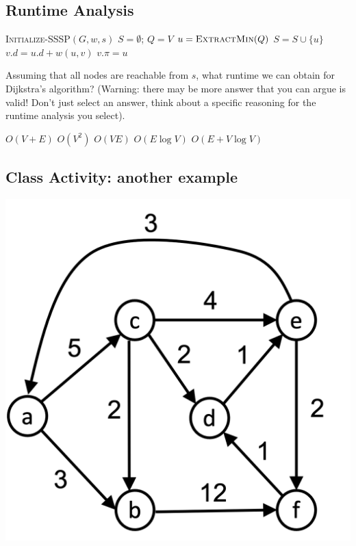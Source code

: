 \documentclass[11  pt]{exam}
\begin{document}
	\newpage
	
	
	\subsection{Runtime Analysis}
	\begin{algorithmic}
		\State \textsc{Initialize-SSSP}$(G,w,s)$
		\State $S = \emptyset$; $Q = V$
		\State $u = \textsc{ExtractMin}(Q)$
		\State $S = S \cup \{u\}$
		\State $v.d = u.d + w(u,v)$
		\State $v.\pi = u$
		\EndIf
		\EndFor
		\EndWhile
	\end{algorithmic}
	\begin{Qu}
		Assuming that all nodes are reachable from $s$, what runtime we can obtain for Dijkstra's algorithm? (Warning: there may be more answer that you can argue is valid! Don't just select an answer, think about a specific reasoning for the runtime analysis you select).
		\begin{itemize}
			\aitem $O(V + E)$ 
			\bitem $O(V^2)$
			\citem $O(VE)$
			\ditem $O(E \log V)$
			\eitem $O(E + V \log V)$
		\end{itemize}
	\end{Qu}
	
	
	\newpage
	\subsection{Class Activity: another example}
	\includegraphics[width = .75\linewidth]{dijkstrasalg.png}
	
\end{document}
